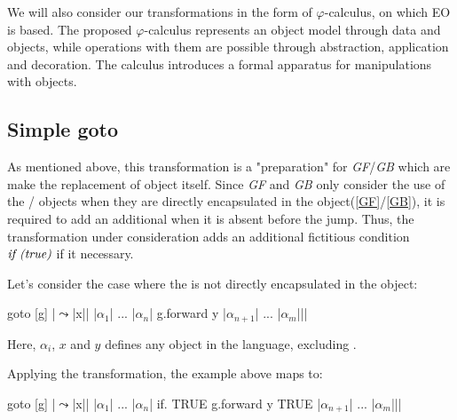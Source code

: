 \documentclass[sigplan,review,11pt,nonacm,natbib=false]{acmart}
\theoremstyle{theorems}
\begin{document}

    We will also consider our transformations in the form of $\varphi$-calculus, on which EO is based.
    The proposed $\varphi$-calculus represents an object model through data and objects, while operations with them are possible through abstraction, application and decoration.
    The calculus introduces a formal apparatus for manipulations with objects.




    \subsection{Simple goto} \label{SG}
    As mentioned above, this transformation is a "preparation" for \emph{GF}/\emph{GB} which are make the replacement of object  itself.
    Since \emph{GF} and \emph{GB} only consider the use of the / objects when they are directly encapsulated in the  object(\cref{GF}/\cref{GB}), it is required to add an additional  when it is absent before the jump.
    Thus, the transformation under consideration adds an additional fictitious condition $\emph{if (true)}$ if it necessary.

    Let's consider the case where the  is not directly encapsulated in the  object:
    \begin{ffcode}
        goto
        [g]
        |$\leadsto$|x|$\label{ln:sf0}$|
        |$\alpha_1$|
        ...
        |$\alpha_n$|
        g.forward y
        |$\alpha_{n+1}$|
        ...
        |$\alpha_{m}$||$\label{ln:sf1}$|
    \end{ffcode}
    Here, $\alpha_{i}$, $x$ and $y$ defines any object in the language, excluding .

    Applying the transformation, the example above maps to:
    \begin{ffcode}
        goto
        [g]
        |$\leadsto$|x|$\label{ln:tsf0}$|
        |$\alpha_1$|
        ...
        |$\alpha_n$|
        if.
        TRUE
        g.forward y
        TRUE
        |$\alpha_{n+1}$|
        ...
        |$\alpha_{m}$||$\label{ln:tsf1}$|
    \end{ffcode}
\end{document}
